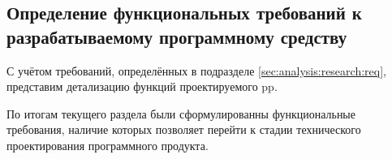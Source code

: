 \subsection{Определение функциональных требований к разрабатываемому программному средству}
\label{sec:analysis:research:funcreq}

С учётом требований, определённых в подразделе \ref{sec:analysis:research:req}, представим детализацию функций проектируемого \gls{pp}.








По итогам текущего раздела были сформулированны функциональные требования, наличие которых позволяет перейти к стадии технического проектирования программного продукта.